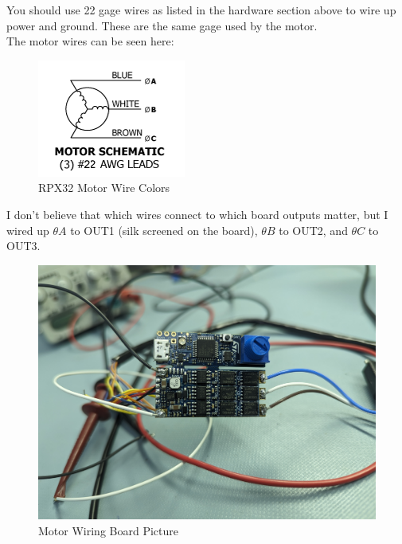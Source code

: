 \documentclass[10pt]{article}
\begin{document}
            You should use 22 gage wires as listed in the hardware section above to wire up power and ground. These are the same gage used by the motor. \\ 
            The motor wires can be seen here:
			\begin{figure}[H]
				\centerline{\includegraphics[width=\textwidth]{References/Motor Wiring.png}}
				\caption{RPX32 Motor Wire Colors}
			\end{figure}
            I don't believe that which wires connect to which board outputs matter, but I wired up $\theta A$ to OUT1 (silk screened on the board), $\theta B$ to OUT2, and $\theta C$ to OUT3.
			\begin{figure}[H]
				\centerline{\includegraphics[width=\textwidth]{References/Motor Wiring Board Picture.jpg}}
				\caption{Motor Wiring Board Picture}
			\end{figure}
\end{document}
